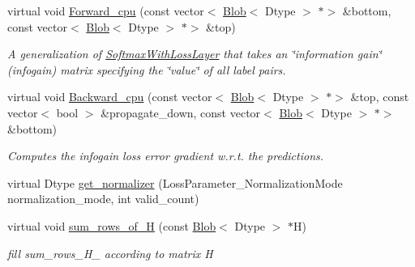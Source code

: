 \begin{DoxyCompactItemize}
virtual void \mbox{\hyperlink{classcaffe_1_1_infogain_loss_layer_a12c67529a9dbc6732db60708a4d9a9f6}{Forward\+\_\+cpu}} (const vector$<$ \mbox{\hyperlink{classcaffe_1_1_blob}{Blob}}$<$ Dtype $>$ $\ast$$>$ \&bottom, const vector$<$ \mbox{\hyperlink{classcaffe_1_1_blob}{Blob}}$<$ Dtype $>$ $\ast$$>$ \&top)
\begin{DoxyCompactList}\small\item\em A generalization of \mbox{\hyperlink{classcaffe_1_1_softmax_with_loss_layer}{Softmax\+With\+Loss\+Layer}} that takes an \char`\"{}information gain\char`\"{} (infogain) matrix specifying the \char`\"{}value\char`\"{} of all label pairs. \end{DoxyCompactList}\item 
virtual void \mbox{\hyperlink{classcaffe_1_1_infogain_loss_layer_a2d3651cf83b24ee0508adeeed32d2fc2}{Backward\+\_\+cpu}} (const vector$<$ \mbox{\hyperlink{classcaffe_1_1_blob}{Blob}}$<$ Dtype $>$ $\ast$$>$ \&top, const vector$<$ bool $>$ \&propagate\+\_\+down, const vector$<$ \mbox{\hyperlink{classcaffe_1_1_blob}{Blob}}$<$ Dtype $>$ $\ast$$>$ \&bottom)
\begin{DoxyCompactList}\small\item\em Computes the infogain loss error gradient w.\+r.\+t. the predictions. \end{DoxyCompactList}\item 
virtual Dtype \mbox{\hyperlink{classcaffe_1_1_infogain_loss_layer_a9c223a4b6dc5a48fb56bf653111abea1}{get\+\_\+normalizer}} (Loss\+Parameter\+\_\+\+Normalization\+Mode normalization\+\_\+mode, int valid\+\_\+count)
\item 
\mbox{\label{classcaffe_1_1_infogain_loss_layer_a30c3135fc7c5d44b159e59861cd4b232}} 
virtual void \mbox{\hyperlink{classcaffe_1_1_infogain_loss_layer_a30c3135fc7c5d44b159e59861cd4b232}{sum\+\_\+rows\+\_\+of\+\_\+H}} (const \mbox{\hyperlink{classcaffe_1_1_blob}{Blob}}$<$ Dtype $>$ $\ast$H)
\begin{DoxyCompactList}\small\item\em fill sum\+\_\+rows\+\_\+\+H\+\_\+ according to matrix H \end{DoxyCompactList}\end{DoxyCompactItemize}
